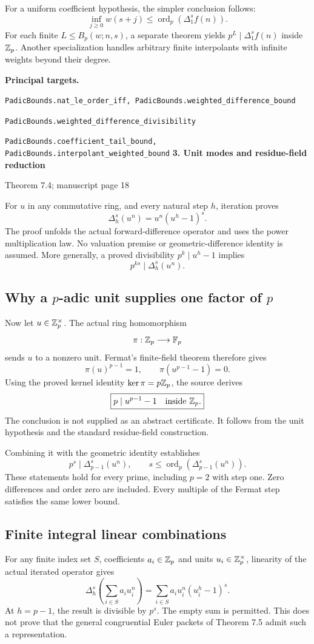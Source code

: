 \documentclass[11pt]{article}
\newcommand{\target}[1]{{\footnotesize\texttt{#1}}}
\newcommand{\pageheading}[2]{{\Large\bfseries\color{ink}#1}\par{\small #2}\par\medskip}
\newcommand{\ord}{\operatorname{ord}}
\begin{document}
For a uniform coefficient hypothesis, the simpler conclusion follows:
\[
 \boxed{\inf_{j\geq0} w(s+j)\leq\ord_p(\Delta_1^s f(n)).}
\]
For each finite $L\leq B_p(w;n,s)$, a separate theorem yields $p^L\mid\Delta_1^s f(n)$ inside $\mathbb Z_p$. Another specialization handles arbitrary finite interpolants with infinite weights beyond their degree.

\textbf{Principal targets.}\par
\target{PadicBounds.nat\_le\_order\_iff, PadicBounds.weighted\_difference\_bound}\par
\target{PadicBounds.weighted\_difference\_divisibility}\par
\target{PadicBounds.coefficient\_tail\_bound, PadicBounds.interpolant\_weighted\_bound}
\newpage
\pageheading{3. Unit modes and residue-field reduction}{Theorem 7.4; manuscript page 18}
For $u$ in any commutative ring, and every natural step $h$, iteration proves
\[
 \boxed{\Delta_h^s(u^n)=u^n(u^h-1)^s.}
\]
The proof unfolds the actual forward-difference operator and uses the power multiplication law. No valuation premise or geometric-difference identity is assumed. More generally, a proved divisibility $p^k\mid u^h-1$ implies
\[
 p^{ks}\mid\Delta_h^s(u^n).
\]

\subsection*{Why a $p$-adic unit supplies one factor of $p$}
Now let $u\in\mathbb Z_p^\times$. The actual ring homomorphism
\[
 \pi:\mathbb Z_p\longrightarrow\mathbb F_p
\]
 sends $u$ to a nonzero unit. Fermat's finite-field theorem therefore gives
\[
 \pi(u)^{p-1}=1,\qquad \pi(u^{p-1}-1)=0.
\]
Using the proved kernel identity $\ker\pi=p\mathbb Z_p$, the source derives
\[
 \boxed{p\mid u^{p-1}-1\quad\text{inside }\mathbb Z_p.}
\]
The conclusion is not supplied as an abstract certificate. It follows from the unit hypothesis and the standard residue-field construction.

Combining it with the geometric identity establishes
\[
 \boxed{p^s\mid\Delta_{p-1}^s(u^n),\qquad
 s\leq\ord_p(\Delta_{p-1}^s(u^n)).}
\]
These statements hold for every prime, including $p=2$ with step one. Zero differences and order zero are included. Every multiple of the Fermat step satisfies the same lower bound.

\subsection*{Finite integral linear combinations}
For any finite index set $S$, coefficients $a_i\in\mathbb Z_p$ and units $u_i\in\mathbb Z_p^\times$, linearity of the actual iterated operator gives
\[
 \Delta_h^s\!\left(\sum_{i\in S}a_i u_i^n\right)
 =\sum_{i\in S}a_i u_i^n(u_i^h-1)^s.
\]
At $h=p-1$, the result is divisible by $p^s$. The empty sum is permitted. This does not prove that the general congruential Euler packets of Theorem 7.5 admit such a representation.
\end{document}
